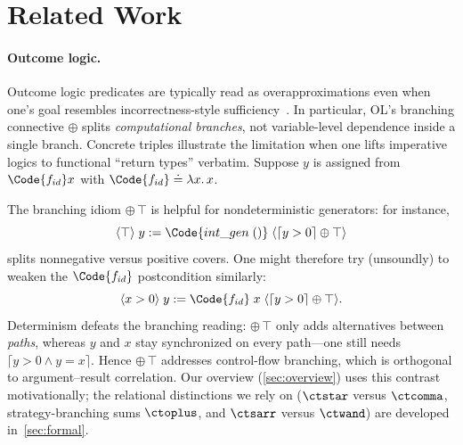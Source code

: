 \section{Related Work}\label{sec:related}

\paragraph{Outcome logic.}
Outcome logic predicates are typically read as overapproximations even when one's goal resembles incorrectness-style sufficiency~\cite{ZDS23,Zil25TOPLAS}.
In particular, OL's branching connective \(\oplus\) splits \emph{computational branches}, not variable-level dependence inside a single branch.
Concrete triples illustrate the limitation when one lifts imperative logics to functional ``return types'' verbatim.
Suppose \(y\) is assigned from \(\Code{f_{id}} x\) with \(\Code{f_{id}} \doteq \lambda x.\,x\).

The branching idiom \(\oplus\,\top\) is helpful for nondeterministic generators: for instance,
 \[
   \langle \top\rangle\; y \mathrel{:=} \Code{int\_gen\;()}
   \;\langle \lceil y > 0 \rceil \oplus \top \rangle
\]
splits nonnegative versus positive covers.
One might therefore try (unsoundly) to weaken the \(\Code{f_{id}}\) postcondition similarly:
\[
   \langle x > 0\rangle\; y \mathrel{:=} \Code{f_{id}}\;x
   \;\langle \lceil y > 0 \rceil \oplus \top \rangle.
\]
Determinism defeats the branching reading: \(\oplus\,\top\) only adds alternatives between \emph{paths}, whereas \(y\) and \(x\) stay synchronized on every path---one still needs \(\lceil y > 0 \land y = x \rceil\).
Hence \(\oplus\,\top\) addresses control-flow branching, which is orthogonal to argument--result correlation.
Our overview (\autoref{sec:overview}) uses this contrast motivationally; the relational distinctions we rely on (\(\ctstar\) versus \(\ctcomma\), strategy-branching sums \(\ctoplus\), and \(\ctsarr\) versus \(\ctwand\)) are developed in~\autoref{sec:formal}.
